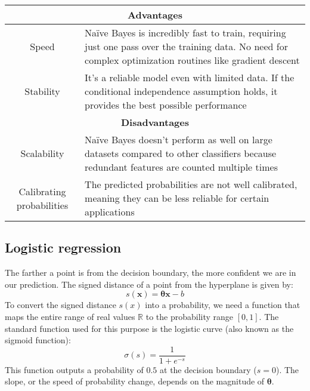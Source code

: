 \renewcommand*{\arraystretch}{1.5}
\begin{table}[!ht]
    \centering
    \begin{tabular}{|c|p{10cm}|}
    \hline
    \multicolumn{2}{|c|}{\textbf{Advantages}} \\ \hline
    Speed                       & Naïve Bayes is incredibly fast to train, requiring just one pass over the training data. No need for complex optimization routines like gradient descent   \\ \hline
    Stability                   & It's a reliable model even with limited data. If the conditional independence assumption holds, it provides the best possible performance  \\ \hline
    \multicolumn{2}{|c|}{\textbf{Disadvantages}} \\ \hline
    Scalability                 & Naïve Bayes doesn't perform as well on large datasets compared to other classifiers because redundant features are counted multiple times \\ \hline
    Calibrating probabilities   & The predicted probabilities are not well calibrated, meaning they can be less reliable for certain applications \\ \hline
    \end{tabular}
\end{table}
\renewcommand*{\arraystretch}{1}

\subsection{Logistic regression}
The farther a point is from the decision boundary, the more confident we are in our prediction.
The signed distance of a point from the hyperplane is given by:
\[s(\textbf{x}) = \boldsymbol{\theta}\textbf{x}-b\]
\noindent To convert the signed distance $s(x)$ into a probability, we need a function that maps the entire range of real values $\mathbb{R}$ to the probability range $[0,1]$. 
The standard function used for this purpose is the logistic curve (also known as the sigmoid function):
\[\sigma(s)=\dfrac{1}{1+e^{-s}}\]
This function outputs a probability of $0.5$ at the decision boundary ($s=0$).
The slope, or the speed of probability change, depends on the magnitude of $\boldsymbol{\theta}$.

